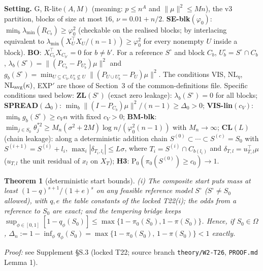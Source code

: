 \documentclass[11pt]{article}
\newtheorem{thmpart}{Theorem}[theorem]
\theoremstyle{definition}
\theoremstyle{remark}
\renewcommand{\Pr}{\mathrm{P}}
\newcommand{\Sz}{S_0}
\begin{document}
\noindent\textbf{Setting.} G, R-lite$(A,M)$ (meaning: $p\le n^A$ and $\|\mu\|^2\le Mn$), the v3 partition, blocks of size
at most $16$, $\nu=0.01+n/2$. \textbf{SE-blk}$(\varphi_0)$: $\min_b\lambda_{\min}(R_{C_b})\ge\varphi_0^2$ (checkable on the realised
blocks; by interlacing equivalent to $\lambda_{\min}(X_U^\top X_U/(n-1))\ge\varphi_0^2$ for every nonempty $U$ inside a block).
\textbf{BO}: $X_{C_b}^\top X_{C_{b'}}=0$ for $b\ne b'$. For a reference $S^\circ$ and block $C_b$, $U_b^\circ=S^\circ\cap C_b$,
$\lambda_b(S^\circ)=\|(P_{C_b}-P_{U_b^\circ})\mu\|^2$ and $g_b(S^\circ)=\min_{U\subseteq C_b,U_b^\circ\not\subseteq U}\|(P_{U\cup U_b^\circ}-P_U)\mu\|^2$.
The conditions VIS, $\mathrm{NL}_\eta$, $\mathrm{NL}_{\rm avg}(\kappa)$, EXP$'$ are those of Section~3 of the common-definitions file.
Specific conditions used below: \textbf{ZL}$(S^\circ)$ (exact zero leakage): $\lambda_b(S^\circ)=0$ for all blocks;
\textbf{SPREAD}$(\Delta_0)$: $\min_b\|(I-P_{C_b})\mu\|^2/(n-1)\ge\Delta_0>0$; \textbf{VIS-lin}$(c_V)$: $\min_bg_b(S^\circ)\ge c_Vn$ with fixed
$c_V>0$; \textbf{BM-blk}: $\min_{j\in\Sz}\theta_j^{*2}\ge M_n(\sigma^2+2M)\log n/(\varphi_0^2(n-1))$ with $M_n\to\infty$;
\textbf{CL}$(L)$ (chain leakage): along a deterministic addition chain $S^{(0)}\subset\cdots\subset S^{(c)}=\Sz$ with
$S^{(i+1)}=S^{(i)}+l_i$, $\max_i|\delta_{T_i,l_i}|\le L\sigma$, where $T_i=S^{(i)}\cap C_{b(l_i)}$ and
$\delta_{T,l}=u_{T,l}^\top\mu$ ($u_{T,l}$ the unit residual of $x_l$ on $X_T$); \textbf{H3}: $\Pr_0(\pi_0(S^{(0)})\ge c_0)\to1$.

\begin{thmpart}[deterministic start bounds]\label{thm:T22}
\emph{(i)} The composite start puts mass at least $(1-q)^{s+1}/(1+e)^s$ on any feasible reference model $S^\circ$
($S^\circ\ne\Sz$ allowed), with $q,e$ the table constants of the locked T22(i); the odds from a reference to $\Sz$ are exact;
and the tempering bridge keeps $\sup_{\phi\in[0,1]}[1-q_\phi(\Sz)]\le\max\{1-\pi_0(\Sz),1-\pi(\Sz)\}$. Hence, if $\Sz\in\Omega$,
$\Delta_n:=1-\inf_{\phi}q_\phi(\Sz)=\max\{1-\pi_0(\Sz),\,1-\pi(\Sz)\}<1$ exactly.
\end{thmpart}
\noindent\emph{Proof:} see Supplement \S S.3 (locked T22; source branch \texttt{theory/W2-T26}, \texttt{PROOF.md} Lemma 1).
\end{document}
